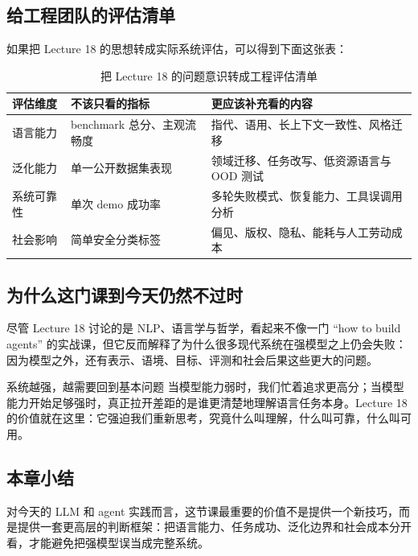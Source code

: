 \subsection{给工程团队的评估清单}

如果把 Lecture 18 的思想转成实际系统评估，可以得到下面这张表：

\begin{table}[H]
\centering
\begin{tabular}{p{} p{} p{}}
\toprule
评估维度 & 不该只看的指标 & 更应该补充看的内容 \\
\midrule
语言能力 & benchmark 总分、主观流畅度 & 指代、语用、长上下文一致性、风格迁移 \\
泛化能力 & 单一公开数据集表现 & 领域迁移、任务改写、低资源语言与 OOD 测试 \\
系统可靠性 & 单次 demo 成功率 & 多轮失败模式、恢复能力、工具误调用分析 \\
社会影响 & 简单安全分类标签 & 偏见、版权、隐私、能耗与人工劳动成本 \\
\bottomrule
\end{tabular}
\caption{把 Lecture 18 的问题意识转成工程评估清单}
\end{table}

\subsection{为什么这门课到今天仍然不过时}

尽管 Lecture 18 讨论的是 NLP、语言学与哲学，看起来不像一门 ``how to build agents'' 的实战课，但它反而解释了为什么很多现代系统在强模型之上仍会失败：因为模型之外，还有表示、语境、目标、评测和社会后果这些更大的问题。

\begin{importantbox}{系统越强，越需要回到基本问题}
当模型能力弱时，我们忙着追求更高分；当模型能力开始足够强时，真正拉开差距的是谁更清楚地理解语言任务本身。Lecture 18 的价值就在这里：它强迫我们重新思考，究竟什么叫理解，什么叫可靠，什么叫可用。
\end{importantbox}

\subsection{本章小结}

对今天的 LLM 和 agent 实践而言，这节课最重要的价值不是提供一个新技巧，而是提供一套更高层的判断框架：把语言能力、任务成功、泛化边界和社会成本分开看，才能避免把强模型误当成完整系统。


